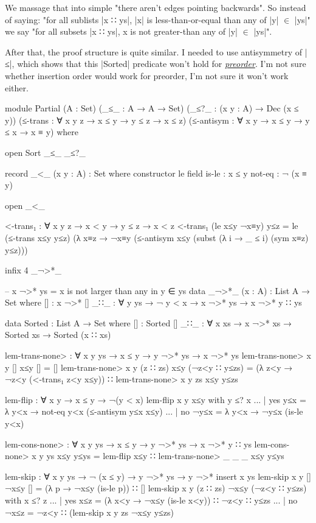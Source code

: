 We massage that into simple "there aren't edges pointing backwards".
So instead of saying:
"for all sublists |x ∷ ys|, |x| is less-than-or-equal than any of |y| $\in$ |ys|"
we say
"for all subsets |x ∷ ys|, x is not greater-than any of |y| $\in$ |ys|".

After that, the proof structure is quite similar.
I needed to use antisymmetry of |≤|, which shows that
this |Sorted| predicate won't hold for \href{https://en.wikipedia.org/wiki/Preorder}{\emph{preorder}}.
I'm not sure whether insertion order would work for preorder, I'm not
sure it won't work either.

\begin{code}
module Partial (A : Set) (_≤_ : A → A → Set)
  (_≤?_ : (x y : A) → Dec (x ≤ y))
  (≤-trans : ∀ {x y z} → x ≤ y → y ≤ z → x ≤ z)
  (≤-antisym : ∀ {x y} → x ≤ y → y ≤ x → x ≡ y)
  where

  open Sort _≤_ _≤?_

  record _<_ (x y : A) : Set where
    constructor le
    field
      is-le : x ≤ y
      not-eq : ¬ (x ≡ y)

  open _<_

  <-trans₁ : ∀ {x y z} → x < y → y ≤ z → x < z
  <-trans₁ (le x≤y ¬x≡y) y≤z = le
    (≤-trans x≤y y≤z)
    (λ x≡z → ¬x≡y (≤-antisym x≤y (subst (λ i → _ ≤ i) (sym x≡z) y≤z)))

  infix 4 _¬>*_

  -- x ¬>* ys = x is not larger than any in y ∈ ys
  data _¬>*_ (x : A) : List A → Set where
    []  : x ¬>* []
    _∷_ : ∀ {y ys} → ¬ y < x → x ¬>* ys → x ¬>* y ∷ ys

  data Sorted : List A → Set where
    [] : Sorted []
    _∷_ : ∀ {x xs} → x ¬>* xs → Sorted xs → Sorted (x ∷ xs)

  lem-trans-none> :  ∀ x y ys → x ≤ y → y ¬>* ys → x ¬>* ys
  lem-trans-none> x y []       x≤y [] = []
  lem-trans-none> x y (z ∷ zs) x≤y (¬z<y ∷ y≤zs) =
    (λ z<y → ¬z<y (<-trans₁ z<y x≤y)) ∷ lem-trans-none> x y zs x≤y y≤zs

  lem-flip : ∀ {x y} → x ≤ y → ¬(y < x)
  lem-flip {x} {y} x≤y with y ≤? x
  ... | yes y≤x = λ y<x → not-eq y<x (≤-antisym y≤x x≤y)
  ... | no ¬y≤x = λ y<x → ¬y≤x (is-le y<x)

  lem-cons-none> : ∀ x y ys → x ≤ y → y ¬>* ys → x ¬>* y ∷ ys
  lem-cons-none> x y ys x≤y y≤ys =
    lem-flip x≤y ∷ lem-trans-none> _ _ _ x≤y y≤ys

  lem-skip : ∀ x y ys → ¬ (x ≤ y) → y ¬>* ys → y ¬>* insert x ys
  lem-skip x y []       ¬x≤y []   = (λ p → ¬x≤y (is-le p)) ∷ []
  lem-skip x y (z ∷ zs) ¬x≤y (¬z<y ∷ y≤zs) with x ≤? z
  ... | yes x≤z = (λ x<y → ¬x≤y (is-le x<y)) ∷ ¬z<y ∷ y≤zs
  ... | no ¬x≤z = ¬z<y ∷ (lem-skip x y zs ¬x≤y y≤zs)


\end{code}
